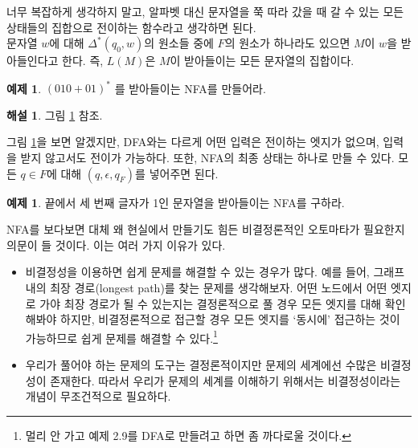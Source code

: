 \documentclass[b5paper, 11pt]{book}
\theoremstyle{definition}
\newtheorem{ex}[defn]{예제}
\newtheorem*{ans*}{해설}
\begin{document}
너무 복잡하게 생각하지 말고, 알파벳 대신 문자열을 쭉 따라 갔을 때 갈 수 있는 모든 상태들의 집합으로 전이하는 함수라고 생각하면 된다.\\
문자열 $w$에 대해 $\Delta^* (q_0, w)$의 원소들 중에 $F$의 원소가 하나라도 있으면 $M$이 $w$을 받아들인다고 한다. 즉, $L(M)$은 $M$이 받아들이는 모든 문자열의 집합이다. 
\begin{ex}\label{010+01}
    $(010+01)^*$ 를 받아들이는 NFA를 만들어라. 
\end{ex} 
\begin{ans*}
    그림 \ref{(010+01)^*} 참조.
\end{ans*}
\begin{figure}[ht]
    \centering
    \caption{} 
    \label{(010+01)^*}
\end{figure}
그림 \ref{(010+01)^*}을 보면 알겠지만, DFA와는 다르게 어떤 입력은 전이하는 엣지가 없으며, 입력을 받지 않고서도 전이가 가능하다. 또한, NFA의 최종 상태는 하나로 만들 수 있다. 모든 $q \in F$에 대해 $(q, \epsilon, q_F )$를 넣어주면 된다.
\begin{ex}
    끝에서 세 번째 글자가 1인 문자열을 받아들이는 NFA를 구하라. 
\end{ex}
NFA를 보다보면 대체 왜 현실에서 만들기도 힘든 비결정론적인 오토마타가 필요한지 의문이 들 것이다. 이는 여러 가지 이유가 있다.
\begin{itemize}
    \item 비결정성을 이용하면 쉽게 문제를 해결할 수 있는 경우가 많다. 예를 들어, 그래프 내의 최장 경로(longest path)를 찾는 문제를 생각해보자. 어떤 노드에서 어떤 엣지로 가야 최장 경로가 될 수 있는지는 결정론적으로 풀 경우 모든 엣지를 대해 확인해봐야 하지만, 비결정론적으로 접근할 경우 모든 엣지를 `동시에' 접근하는 것이 가능하므로 쉽게 문제를 해결할 수 있다.\footnote{멀리 안 가고 예제 2.9를 DFA로 만들려고 하면 좀 까다로울 것이다.}
    \item 우리가 풀어야 하는 문제의 도구는 결정론적이지만 문제의 세계에선 수많은 비결정성이 존재한다. 따라서 우리가 문제의 세계를 이해하기 위해서는 비결정성이라는 개념이 무조건적으로 필요하다.
\end{itemize}
\end{document}
